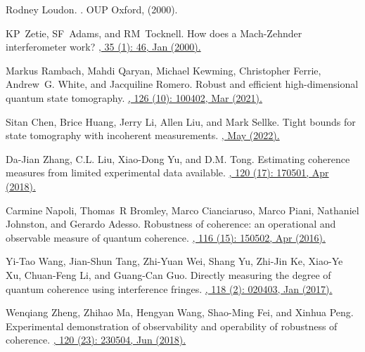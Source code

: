 \documentclass[letterpaper,onecolumn,12pt,accepted=2024-01-17]{article}
\begin{document}
\begin{thebibliography}{100}
Rodney Loudon.
.
\newblock OUP Oxford, (2000).

KP~Zetie, SF~Adams, and RM~Tocknell.
\newblock How does a {M}ach-{Z}ehnder interferometer work?
\href{http://dx.doi.org/10.1088/0031-9120/35/1/308}{, 35 (1): 46, Jan (2000).}


Markus Rambach, Mahdi Qaryan, Michael Kewming, Christopher Ferrie, Andrew~G.
  White, and Jacquiline Romero.
\newblock Robust and efficient high-dimensional quantum state tomography.
\href{https://doi.org/10.1103/PhysRevLett.126.100402}{, 126 (10): 100402, Mar (2021).}

Sitan Chen, Brice Huang, Jerry Li, Allen Liu, and Mark Sellke.
\newblock Tight bounds for state tomography with incoherent measurements.
\href{https://doi.org/10.48550/arXiv.2206.05265}{, May (2022).}

Da-Jian Zhang, C.L. Liu, Xiao-Dong Yu, and D.M. Tong.
\newblock Estimating coherence measures from limited experimental data  available.
\href{https://doi.org/10.1103/PhysRevLett.120.170501}{, 120 (17): 170501, Apr (2018).}

Carmine Napoli, Thomas~R Bromley, Marco Cianciaruso, Marco Piani, Nathaniel
  Johnston, and Gerardo Adesso.
\newblock Robustness of coherence: an operational and observable measure of
  quantum coherence.
\href{https://doi.org/10.1103/PhysRevLett.116.150502}{, 116 (15): 150502, Apr (2016).}

Yi-Tao Wang, Jian-Shun Tang, Zhi-Yuan Wei, Shang Yu, Zhi-Jin Ke, Xiao-Ye Xu,
  Chuan-Feng Li, and Guang-Can Guo.
\newblock Directly measuring the degree of quantum coherence using interference  fringes.
\href{https://doi.org/10.1103/PhysRevLett.118.020403}{, 118 (2): 020403, Jan (2017).}

Wenqiang Zheng, Zhihao Ma, Hengyan Wang, Shao-Ming Fei, and Xinhua Peng.
\newblock Experimental demonstration of observability and operability of  robustness of coherence.
\href{https://doi.org/10.1103/PhysRevLett.120.230504}{, 120 (23): 230504, Jun (2018).}


\end{thebibliography}
\end{document}
